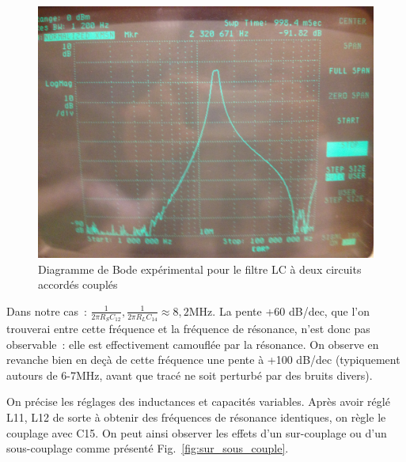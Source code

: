 \documentclass{article}
\begin{document}
\begin{figure}[h]
	\centering
	\includegraphics[width=.5\textwidth]{1MHz_100MHz}
	\caption{Diagramme de Bode expérimental pour le filtre LC à deux circuits accordés couplés}
	\label{fig:LC2plot}
\end{figure}

Dans notre cas~: ${\frac{1}{2\pi R_S C_{12}}, \frac{1}{2\pi R_L C_{14}}\approx 8,2\mathrm{MHz}}$. La pente +60 dB/dec, que l'on trouverai entre cette fréquence et la fréquence de résonance, n'est donc pas observable~: elle est effectivement camouflée par la résonance. On observe en revanche bien en deçà de cette fréquence une pente à +100 dB/dec (typiquement autours de 6-7MHz, avant que tracé ne soit perturbé par des bruits divers).




On précise les réglages des inductances et capacités variables. Après avoir réglé L11, L12 de sorte à obtenir des fréquences de résonance identiques, on règle le couplage avec C15. On peut ainsi observer les effets d'un sur-couplage ou d'un sous-couplage comme présenté Fig.~\ref{fig:sur_sous_couple}.
\end{document}
